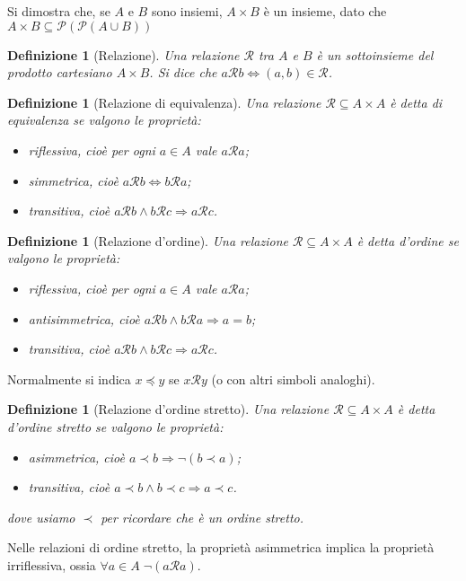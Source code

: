 \documentclass[a4paper,10pt,oneside]{article}
\newcommand{\myname}[1]{\emph{#1}}
\newcommand{\parti}[1]{\mathcal{P}(#1)}
\newcommand{\rel}{\mathcal R}
\theoremstyle{plain}
\newtheorem{mydef}[mytheorem]{Definizione}
\theoremstyle{definition}
\theoremstyle{remark}
\begin{document}
Si dimostra che, se $A$ e $B$ sono insiemi, $A\times B$ è un insieme, dato che $A\times B \subseteq \parti{\parti{A\cup B}}$

\begin{mydef}[Relazione]
 Una \myname{relazione} $\rel$ tra $A$ e $B$ è un sottoinsieme del prodotto cartesiano $A\times B$. Si dice che $a\rel b \Leftrightarrow (a,b) \in \rel$.
\end{mydef}

\begin{mydef}[Relazione di equivalenza]
 Una relazione $\rel \subseteq A\times A$ è detta di equivalenza se valgono le proprietà:
 \begin{itemize}
  \item riflessiva, cioè per ogni $a\in A$ vale $a\rel a$;
  \item simmetrica, cioè $a \rel b \Leftrightarrow b \rel a$;
  \item transitiva, cioè $a \rel b \land b \rel c \Rightarrow a \rel c$.
 \end{itemize}
\end{mydef}

\begin{mydef}[Relazione d'ordine]
 Una relazione $\rel \subseteq A\times A$ è detta d'ordine se valgono le proprietà:
 \begin{itemize}
  \item riflessiva, cioè per ogni $a\in A$ vale $a\rel a$;
  \item antisimmetrica, cioè $a \rel b \land b \rel a\Rightarrow a = b$;
  \item transitiva, cioè $a \rel b \land b \rel c \Rightarrow a \rel c$.
 \end{itemize}
\end{mydef}

Normalmente si indica $x \preceq y$ se $x \rel y$ (o con altri simboli analoghi).

\begin{mydef}[Relazione d'ordine stretto]
 Una relazione $\rel \subseteq A\times A$ è detta d'ordine stretto se valgono le proprietà:
 \begin{itemize}
  \item asimmetrica, cioè $a \prec b \Rightarrow \lnot (b \prec a)$;
  \item transitiva, cioè $a \prec b \land b \prec c \Rightarrow a \prec c$.
 \end{itemize}
 dove usiamo $\prec$ per ricordare che è un ordine stretto.
\end{mydef}
Nelle relazioni di ordine stretto, la proprietà asimmetrica implica la proprietà irriflessiva, ossia $\forall a \in A \;\lnot (a \rel a)$.
\end{document}
